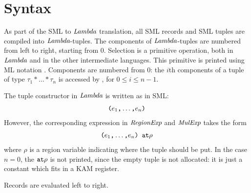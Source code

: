 \documentclass[12pt]{book}
\begin{document}
\section{Syntax}
As part of the SML to $\hbox{\it Lambda}$ translation, all SML records and SML tuples are compiled into
$\hbox{\it Lambda}$-tuples. The components of $\hbox{\it Lambda}$-tuples are numbered from left to right, starting from 0.
Selection is a primitive operation, both in $\hbox{\it Lambda}$ and in the other
intermediate languages. This primitive is printed using ML notation 
. Components are numbered from 0: the $i$th components of
a tuple of type $\tau_1\ast\ldots\ast\tau_n$ is accessed by
, for $0\leq i\leq n-1$. 

The tuple constructor in $\hbox{\it Lambda}$ is written as in SML:
$$\hbox{\tt (}e_1\hbox{\tt ,}\ldots\hbox{\tt ,}e_n\hbox{\tt )}$$
However, the corresponding expression in $\hbox{\it RegionExp}$ and $\hbox{\it MulExp}$ takes the form
$$\hbox{\tt (}e_1\hbox{\tt ,}\ldots\hbox{\tt ,}e_n\hbox{\tt ) at}\rho$$
where $\rho$ is a region variable indicating where the tuple should be put.
In the case $n=0$,  the $\mathbin{\hbox{\tt at}}\rho$ is not printed, since the empty tuple is not
allocated: it is just a constant which fits in a KAM register.

Records are evaluated left to right.
\end{document}
